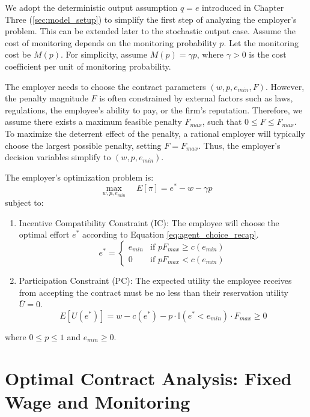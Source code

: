 We adopt the deterministic output assumption $q=e$ introduced in Chapter Three (\ref{sec:model_setup}) to simplify the first step of analyzing the employer's problem. This can be extended later to the stochastic output case.
Assume the cost of monitoring depends on the monitoring probability $p$. Let the monitoring cost be $M(p)$. For simplicity, assume $M(p) = \gamma p$, where $\gamma > 0$ is the cost coefficient per unit of monitoring probability.

The employer needs to choose the contract parameters $(w, p, e_{min}, F)$. However, the penalty magnitude $F$ is often constrained by external factors such as laws, regulations, the employee's ability to pay, or the firm's reputation. Therefore, we assume there exists a maximum feasible penalty $F_{max}$, such that $0 \le F \le F_{max}$. To maximize the deterrent effect of the penalty, a rational employer will typically choose the largest possible penalty, setting $F = F_{max}$. Thus, the employer's decision variables simplify to $(w, p, e_{min})$.

The employer's optimization problem is:
\begin{equation}
\max_{w, p, e_{min}} \quad E[\pi] = e^* - w - \gamma p
\end{equation}
subject to:
\begin{enumerate}
    \item Incentive Compatibility Constraint (IC): The employee will choose the optimal effort $e^*$ according to Equation \ref{eq:agent_choice_recap}.
    \begin{equation} \label{eq:ic_constraint}
    e^* = \begin{cases} e_{min} & \text{if } p F_{max} \ge c(e_{min}) \\ 0 & \text{if } p F_{max} < c(e_{min}) \end{cases}
    \end{equation}
    \item Participation Constraint (PC): The expected utility the employee receives from accepting the contract must be no less than their reservation utility $\bar{U}=0$.
    \begin{equation} \label{eq:pc_constraint}
    E[U(e^*)] = w - c(e^*) - p \cdot \mathbb{I}(e^* < e_{min}) \cdot F_{max} \ge 0
    \end{equation}
\end{enumerate}
where $0 \le p \le 1$ and $e_{min} \ge 0$.

\section{Optimal Contract Analysis: Fixed Wage and Monitoring}
\label{sec:optimal_contract_monitor}


